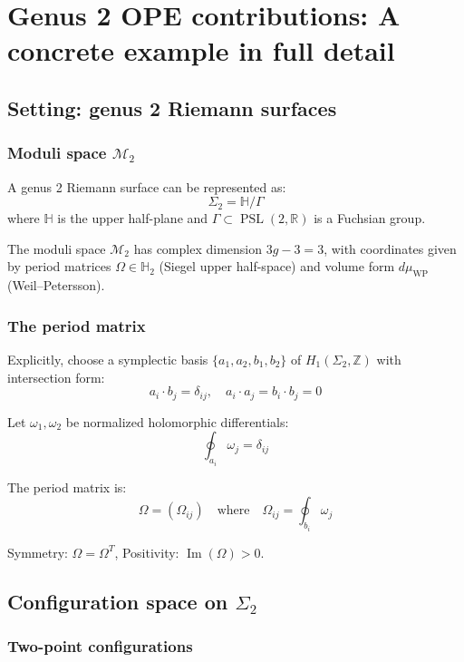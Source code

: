 \section{Genus 2 OPE contributions: A concrete example in full detail}
\label{sec:genus_2_ope_example}

\subsection{Setting: genus 2 Riemann surfaces}

\subsubsection{\texorpdfstring{Moduli space $\mathcal{M}_2$}{Moduli space M-2}}

A genus 2 Riemann surface can be represented as:
\[\Sigma_2 = \mathbb{H}/\Gamma\]
where $\mathbb{H}$ is the upper half-plane and $\Gamma \subset \operatorname{PSL}(2,\mathbb{R})$
is a Fuchsian group.

The moduli space $\mathcal{M}_2$ has complex dimension $3g-3 = 3$, with coordinates given by period matrices $\Omega \in \mathbb{H}_2$ (Siegel upper half-space) and volume form $d\mu_{\text{WP}}$ (Weil--Petersson).

\subsubsection{The period matrix}

Explicitly, choose a symplectic basis $\{a_1, a_2, b_1, b_2\}$ of $H_1(\Sigma_2, \mathbb{Z})$
with intersection form:
\[a_i \cdot b_j = \delta_{ij}, \quad a_i \cdot a_j = b_i \cdot b_j = 0\]

Let $\omega_1, \omega_2$ be normalized holomorphic differentials:
\[\oint_{a_i} \omega_j = \delta_{ij}\]

The period matrix is:
\[\Omega = (\Omega_{ij}) \quad \text{where} \quad \Omega_{ij} = \oint_{b_i} \omega_j\]

Symmetry: $\Omega = \Omega^T$, Positivity: $\operatorname{Im}(\Omega) > 0$.

\subsection{\texorpdfstring{Configuration space on $\Sigma_2$}{Configuration space on Sigma-2}}

\subsubsection{Two-point configurations}

